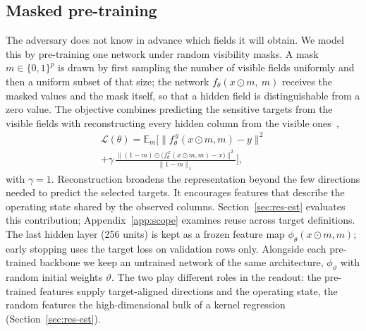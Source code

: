 \subsection{Masked pre-training}
The adversary does not know in advance which fields it will obtain. We model this by
pre-training one network under random visibility masks. A mask $m\in\{0,1\}^{p}$ is drawn by
first sampling the number of visible fields uniformly and then a uniform subset of that size;
the network $f_\theta(x\odot m,\ m)$ receives the masked values and the mask itself, so that a
hidden field is distinguishable from a zero value. The objective combines predicting the sensitive targets from the visible fields with reconstructing every hidden column
from the visible ones~\cite{yoon2020vime,he2022mae},
\begin{multline}\label{eq:pretrain}
\mathcal L(\theta)=\mathbb{E}_{m}\Big[\big\|f^{\,y}_\theta(x\odot m,m)-y\big\|^2\\
+\gamma\,\frac{\big\|(1-m)\odot\big(f^{\,x}_\theta(x\odot m,m)-x\big)\big\|^2}{\|1-m\|_1}\Big],
\end{multline}
with $\gamma=1$. Reconstruction broadens the representation beyond the few directions needed to predict the selected targets. It encourages features that describe the operating state shared by the observed columns. Section~\ref{sec:res-est} evaluates this contribution; Appendix~\ref{app:scope} examines reuse across target definitions. The last hidden layer (256 units) is kept as a frozen feature map
$\phi_\theta(x\odot m, m)$; early stopping uses the target loss on validation rows only. Alongside each pre-trained backbone
we keep an untrained network of the same architecture, $\phi_{\vartheta}$ with random initial weights $\vartheta$. The two
play different roles in the readout: the pre-trained features supply target-aligned directions and the operating state, the
random features the high-dimensional bulk of a kernel regression~\cite{rahimi2007random} (Section~\ref{sec:res-est}).

